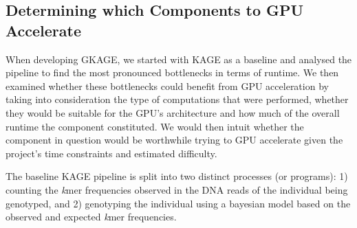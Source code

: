 \subsection{Determining which Components to GPU Accelerate} \label{methods:determining_which_components_to_gpu_accelerate}

When developing GKAGE, we started with KAGE as a baseline and analysed the pipeline to find the most pronounced bottlenecks in terms of runtime.
We then examined whether these bottlenecks could benefit from GPU acceleration by taking into consideration the type of computations that were performed, whether they would be suitable for the GPU's architecture and how much of the overall runtime the component constituted. 
We would then intuit whether the component in question would be worthwhile trying to GPU accelerate given the project's time constraints and estimated difficulty.

The baseline KAGE pipeline is split into two distinct processes (or programs): 1) counting the \textit{k}mer frequencies observed in the DNA reads of the individual being genotyped, and 2) genotyping the individual using a bayesian model based on the observed and expected \textit{k}mer frequencies.

